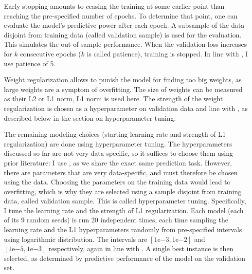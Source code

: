 		Early stopping amounts to ceasing the training at some earlier point than reaching the pre-specified number of epochs. To determine that point, one can evaluate the model's predictive power after each epoch. A subsample of the data disjoint from training data (called validation sample) is used for the evaluation. This simulates the out-of-sample performance. When the validation loss increases for $k$ consecutive epochs ($k$ is called patience), training is stopped. In line with \cite{gu2020empirical}, I use patience of 5. 
		
		Weight regularization allows to punish the model for finding too big weights, as large weights are a symptom of overfitting. The size of weights can be measured as their L2 or L1 norm, L1 norm is used here. The strength of the weight regularization is chosen as a hyperparameter on validation data and line with \cite{gu2020empirical}, as described below in the section on hyperparameter tuning.
		
		The remaining modeling choices (starting learning rate and strength of L1 regularization) are done using hyperparameter tuning. The hyperparameters discussed so far are not very data-specific, so it suffices to choose them using prior literature: I use \cite{gu2020empirical}, as we share the exact same prediction task. However, there are parameters that are very data-specific, and must therefore be chosen using the data. Choosing the parameters on the training data would lead to overfitting, which is why they are selected using a sample disjoint from training data, called validation sample. This is called hyperparameter tuning. Specifically, I tune the learning rate and the strength of L1 regularization. Each model (each of its 9 random seeds) is run 20 independent times, each time sampling the learning rate and the L1 hyperparameters randomly from pre-specified intervals using logarithmic distribution. The intervals are $\left[1\mathrm{e}{-3}, 1\mathrm{e}{-2}\right]$ and $\left[1\mathrm{e}{-5}, 1\mathrm{e}{-3}\right]$ respectively, again in line with \cite{gu2020empirical}. A single best instance is then selected, as determined by predictive performance of the model on the validation set.
		
